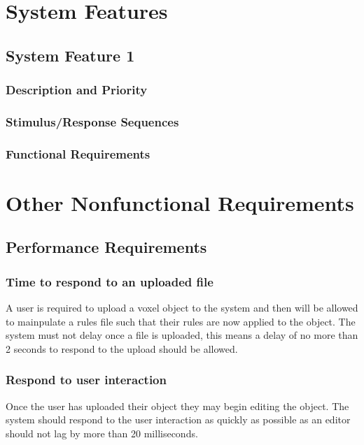 \documentclass[english]{article}
\begin{document}
	\section{System Features}
	
		\subsection{System Feature 1}
		
			 \subsubsection{Description and Priority}
			 
			 \subsubsection{Stimulus/Response Sequences}
			 
			 \subsubsection{Functional Requirements}
			 
	\pagebreak
	
	\section{Other Nonfunctional Requirements}
	
		\subsection{Performance Requirements}
		\subsubsection {Time to respond to an uploaded file}
		A user is required to upload a voxel object to the system and then will be allowed to mainpulate a rules file such that 
		their rules are now applied to the object. The system must not delay once a file is uploaded, this means a delay of no 
		more than 2 seconds to respond to the upload should be allowed.
		
		\subsubsection{Respond to user interaction}
		Once the user has uploaded their object they may begin editing the object. The system should respond to the user 
		interaction as quickly as possible as an editor should not lag by more than 20 milliseconds.
		
\end{document}
